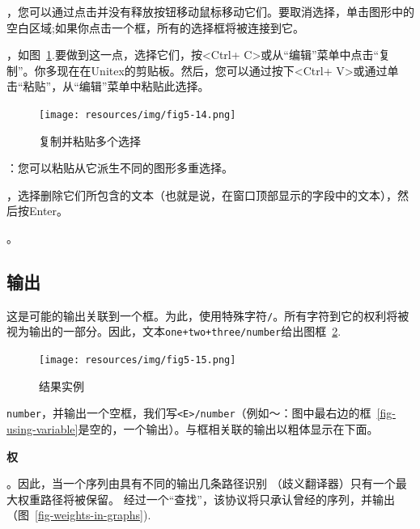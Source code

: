 \bigskip
{}，您可以通过点击并没有释放按钮移动鼠标移动它们。要取消选择，单击图形中的空白区域;如果你点击一个框，所有的选择框将被连接到它。

\bigskip
{}
，如图~\ref{copy-paste-multi-selection}.要做到这一点，选择它们，按<Ctrl+ C>或从“编辑”菜单中点击“复制”。你多现在在Unitex的剪贴板。然后，您可以通过按下<Ctrl+ V>或通过单击“粘贴”，从“编辑”菜单中粘贴此选择。

\begin{figure}[!h]
\begin{center}
\texttt{[image: resources/img/fig5-14.png]}
\caption{复制并粘贴多个选择\label{copy-paste-multi-selection}}
\end{center}
\end{figure}

\bigskip
{}：您可以粘贴从它派生不同的图形多重选择。

\bigskip
{}
，选择删除它们所包含的文本（也就是说，在窗口顶部显示的字段中的文本），然后按Enter。

\bigskip
{}。

\subsection{输出}
\label{Transducers}\index{\verb+/+}
这是可能的输出关联到一个框。为此，使用特殊字符\verb+/+。所有字符到它的权利将被视为输出的一部分。因此，文本\verb$one+two+three/number$给出图框~\ref{fig-exemple-transduction}.

\begin{figure}[h]
\begin{center}
\texttt{[image: resources/img/fig5-15.png]}
\caption{结果实例\label{fig-exemple-transduction}}
\end{center}
\end{figure}

\bigskip
{}\verb+number+，并输出一个空框，我们写\verb+<E>/number+（例如〜：图中最右边的框~\ref{fig-using-variable}是空的，一个输出）。与框相关联的输出以粗体显示在下面。

\bigskip
\noindent \textbf{权}

。因此，当一个序列由具有不同的输出几条路径识别
（歧义翻译器）只有一个最大权重路径将被保留。
经过一个“查找”，该协议将只承认曾经的序列，并输出（图~\ref{fig-weights-in-graphs}).

